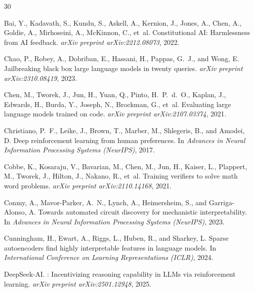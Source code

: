\documentclass[11pt]{article}
\begin{document}
\begin{thebibliography}{30}

Bai, Y., Kadavath, S., Kundu, S., Askell, A., Kernion, J., Jones, A., Chen, A., Goldie, A., Mirhoseini, A., McKinnon, C., et~al.
\newblock Constitutional {AI}: Harmlessness from {AI} feedback.
\newblock \emph{arXiv preprint arXiv:2212.08073}, 2022.

Chao, P., Robey, A., Dobriban, E., Hassani, H., Pappas, G.~J., and Wong, E.
\newblock Jailbreaking black box large language models in twenty queries.
\newblock \emph{arXiv preprint arXiv:2310.08419}, 2023.

Chen, M., Tworek, J., Jun, H., Yuan, Q., Pinto, H.~P.~d.~O., Kaplan, J., Edwards, H., Burda, Y., Joseph, N., Brockman, G., et~al.
\newblock Evaluating large language models trained on code.
\newblock \emph{arXiv preprint arXiv:2107.03374}, 2021.

Christiano, P.~F., Leike, J., Brown, T., Marber, M., Shlegeris, B., and Amodei, D.
\newblock Deep reinforcement learning from human preferences.
\newblock In \emph{Advances in Neural Information Processing Systems (NeurIPS)}, 2017.

Cobbe, K., Kosaraju, V., Bavarian, M., Chen, M., Jun, H., Kaiser, L., Plappert, M., Tworek, J., Hilton, J., Nakano, R., et~al.
\newblock Training verifiers to solve math word problems.
\newblock \emph{arXiv preprint arXiv:2110.14168}, 2021.

Conmy, A., Mavor-Parker, A.~N., Lynch, A., Heimersheim, S., and Garriga-Alonso, A.
\newblock Towards automated circuit discovery for mechanistic interpretability.
\newblock In \emph{Advances in Neural Information Processing Systems (NeurIPS)}, 2023.

Cunningham, H., Ewart, A., Riggs, L., Huben, R., and Sharkey, L.
\newblock Sparse autoencoders find highly interpretable features in language models.
\newblock In \emph{International Conference on Learning Representations (ICLR)}, 2024.

DeepSeek-AI.
: Incentivizing reasoning capability in {LLMs} via reinforcement learning.
\newblock \emph{arXiv preprint arXiv:2501.12948}, 2025.


\end{thebibliography}
\end{document}
